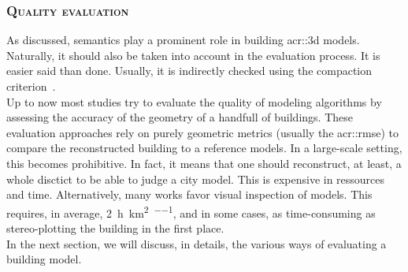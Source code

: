            \begin{figure}[htpb]
            \end{figure}
        
        \subsubsection{\textsc{Quality evaluation}}
            As discussed, semantics play a prominent role in building \gls{acr::3d} models.
            Naturally, it should also be taken into account in the evaluation process.
            It is easier said than done.
            Usually, it is indirectly checked using the compaction criterion~\parencite{lafarge2012creating}.\\
            Up to now most studies try to evaluate the quality of modeling algorithms by assessing the accuracy of the geometry of a handfull of buildings.
            These evaluation approaches rely on purely geometric metrics (usually the \gls{acr::rmse}) to compare the reconstructed building to a reference models.
            In a large-scale setting, this becomes prohibitive.
            In fact, it means that one should reconstruct, at least, a whole disctict to be able to judge a city model.
            This is expensive in ressources and time.
            Alternatively, many works favor visual inspection of models.
            This requires, in average, \SI[per-mode=repeated-symbol]{2}{\hour\per\km\squared\per\expert}, and in some cases, as time-consuming  as stereo-plotting the building in the first place.\\
            In the next section, we will discuss, in details, the various ways of evaluating a building model.

